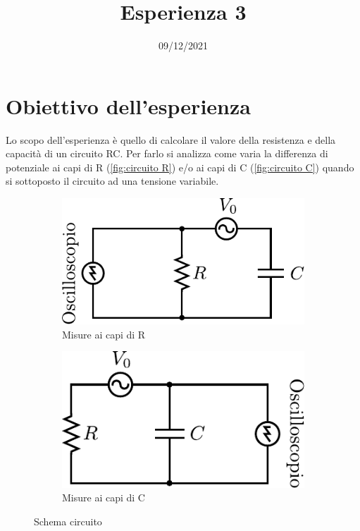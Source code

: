 \documentclass[11pt, a4paper]{article}
\title{Esperienza 3}
\date{09/12/2021}
\author{}
\numberwithin{equation}{section} %
\begin{document}
\maketitle

\thispagestyle{empty}

\tableofcontents

\section{Obiettivo dell'esperienza}

Lo scopo dell'esperienza è quello di calcolare il valore della resistenza e della capacità di un circuito RC. Per farlo si analizza come varia la differenza di potenziale ai capi di R (\autoref{fig:circuito R}) e/o ai capi di C (\autoref{fig:circuito C}) quando si sottoposto il circuito ad una tensione variabile.

\begin{figure}[ht!]
    \centering
    \begin{subfigure}[c]{.3\textwidth}
        \includegraphics[width=\textwidth]{circuito_osc_R.pdf}
        \caption{Misure ai capi di R}
        \label{fig:circuito R}
    \end{subfigure}
    \hspace{1in}
    \begin{subfigure}[c]{.3\textwidth}
        \includegraphics[width=\textwidth]{circuito_osc_C.pdf}
        \caption{Misure ai capi di C}
        \label{fig:circuito C}
    \end{subfigure}
    \caption{Schema circuito}
  \end{figure}
\end{document}
